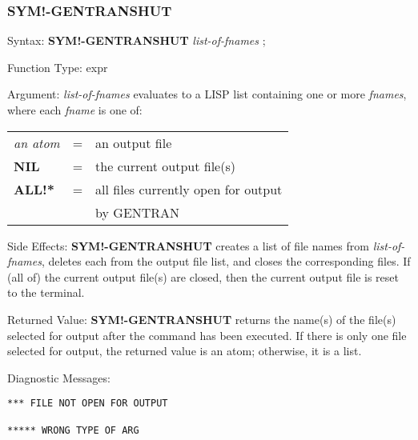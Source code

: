 \subsubsection{SYM!-GENTRANSHUT}
\begin{describe}{Syntax:}
{\bf SYM!-GENTRANSHUT} {\it list-of-fnames\/} ;
\end{describe} 
\begin{describe}{Function Type:}
expr
\end{describe} 
\begin{describe}{Argument:}
{\it list-of-fnames\/} evaluates to a LISP list containing one or more 
{\it fnames}, where each {\it fname\/} is one of:

\begin{tabular}{lll}
{\it an atom} & = &  an output file\\
{\bf NIL} & = & the current output file(s)\\
{\bf ALL!*} & = & all files currently open for output \\
& & by GENTRAN\\
\end{tabular}
\end{describe} 
\begin{describe}{Side Effects:}
{\bf SYM!-GENTRANSHUT} creates a list of file names from {\it list-of-fnames},
deletes each from the output file list,
and closes the corresponding files.  If (all of) the
current output file(s) are closed, then the current output
file is reset to the terminal.
\end{describe} 
\begin{describe}{Returned Value:}
{\bf SYM!-GENTRANSHUT} returns the name(s) of the file(s) selected for
output after the command has been executed.  If there is
only one file selected for output, the returned value is an atom;
otherwise, it is a list.
\end{describe} 
\begin{describe}{Diagnostic Messages:}
\begin{verbatim}
*** FILE NOT OPEN FOR OUTPUT

***** WRONG TYPE OF ARG
\end{verbatim}
\end{describe} 

